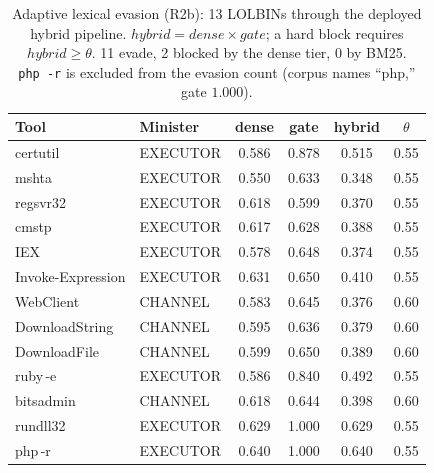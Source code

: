 \begin{table}[t]
\centering
\caption{Adaptive lexical evasion (R2b): 13 LOLBINs through the deployed hybrid
pipeline. $\mathit{hybrid}=\mathit{dense}\times\mathit{gate}$; a hard block
requires $\mathit{hybrid}\geq\theta$. 11 evade, 2 blocked by the dense tier, 0
by BM25. \texttt{php\,-r} is excluded from the evasion count (corpus names
``php,'' gate $1.000$).}
\label{tab:r2b}
\small
\begin{tabular}{llcccc}
\toprule
Tool & Minister & dense & gate & hybrid & $\theta$ \\
\midrule
certutil          & EXECUTOR & 0.586 & 0.878 & 0.515 & 0.55 \\
mshta             & EXECUTOR & 0.550 & 0.633 & 0.348 & 0.55 \\
regsvr32          & EXECUTOR & 0.618 & 0.599 & 0.370 & 0.55 \\
cmstp             & EXECUTOR & 0.617 & 0.628 & 0.388 & 0.55 \\
IEX               & EXECUTOR & 0.578 & 0.648 & 0.374 & 0.55 \\
Invoke-Expression & EXECUTOR & 0.631 & 0.650 & 0.410 & 0.55 \\
WebClient         & CHANNEL  & 0.583 & 0.645 & 0.376 & 0.60 \\
DownloadString    & CHANNEL  & 0.595 & 0.636 & 0.379 & 0.60 \\
DownloadFile      & CHANNEL  & 0.599 & 0.650 & 0.389 & 0.60 \\
ruby\,-e          & EXECUTOR & 0.586 & 0.840 & 0.492 & 0.55 \\
bitsadmin         & CHANNEL  & 0.618 & 0.644 & 0.398 & 0.60 \\
\midrule
rundll32          & EXECUTOR & 0.629 & 1.000 & 0.629 & 0.55 \\
php\,-r           & EXECUTOR & 0.640 & 1.000 & 0.640 & 0.55 \\
\bottomrule
\end{tabular}
\end{table}
